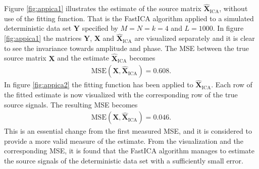 Figure \ref{fig:appica1} illustrates the estimate of the source matrix $\hat{\mathbf{X}}_{\text{ICA}}$, without use of the fitting function. 
That is the FastICA algorithm applied to a simulated deterministic data set $\mathbf{Y}$ specified by $M = N = k = 4$ and $L = 1000$. 
In figure \ref{fig:appica1} the matrices $\mathbf{Y}$, $\mathbf{X}$ and $\hat{\mathbf{X}}_{\text{ICA}}$ are visualized separately and it is clear to see the invariance towards amplitude and phase.
The MSE between the true source matrix $\mathbf{X}$ and the estimate $\hat{\mathbf{X}}_{\text{ICA}}$ becomes
\begin{align*}
\text{MSE}(\mathbf{X}, \hat{\mathbf{X}}_{\text{ICA}}) = 0.608.
\end{align*}
In figure \ref{fig:appica2} the fitting function has been applied to $\hat{\mathbf{X}}_{\text{ICA}}$. Each row of the fitted estimate is now visualized with the corresponding row of the true source signals. 
The resulting MSE becomes 
\begin{align*}
\text{MSE}(\mathbf{X}, \hat{\mathbf{X}}_{\text{ICA}}) = 0.046.
\end{align*}  
This is an essential change from the first measured MSE, and it is considered to provide a more valid measure of the estimate. 
From the visualization and the corresponding MSE, it is found that the FastICA algorithm manages to estimate the source signals of the deterministic data set with a sufficiently small error. 
